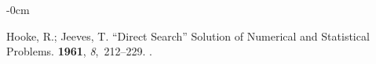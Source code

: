 \documentclass[mathematics,article,accept,pdftex,moreauthors]{Definitions/mdpi}
\begin{document}
\begin{adjustwidth}{-\extralength}{0cm}
\begin{thebibliography}{999}
Hooke, R.; Jeeves, T.
\newblock ``\uppercase{D}irect Search'' Solution of Numerical and Statistical
  Problems.
 {\bf 1961}, {\em 8},~212--229.
.

\end{thebibliography}

		
		
		
		

\end{adjustwidth}
\end{document}
